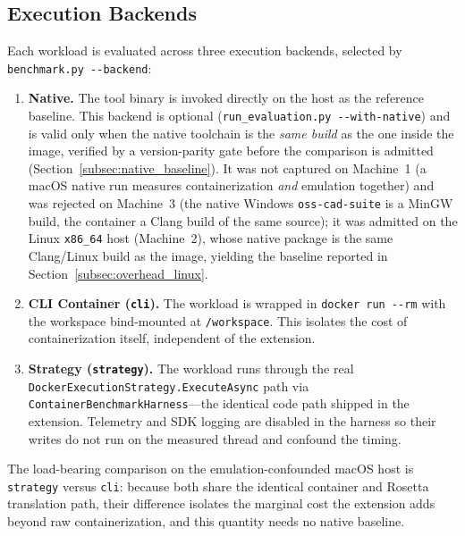 \subsection{Execution Backends}
Each workload is evaluated across three execution backends, selected by \texttt{benchmark.py -{}-backend}:
\begin{enumerate}
    \item \textbf{Native.} The tool binary is invoked directly on the host as the reference baseline. This backend is optional (\texttt{run\_evaluation.py -{}-with-native}) and is valid only when the native toolchain is the \emph{same build} as the one inside the image, verified by a version-parity gate before the comparison is admitted (Section~\ref{subsec:native_baseline}). It was not captured on Machine~1 (a macOS native run measures containerization \emph{and} emulation together) and was rejected on Machine~3 (the native Windows \texttt{oss-cad-suite} is a MinGW build, the container a Clang build of the same source); it was admitted on the Linux \texttt{x86\_64} host (Machine~2), whose native package is the same Clang/Linux build as the image, yielding the baseline reported in Section~\ref{subsec:overhead_linux}.
    \item \textbf{CLI Container (\texttt{cli}).} The workload is wrapped in \texttt{docker run -{}-rm} with the workspace bind-mounted at \texttt{/workspace}. This isolates the cost of containerization itself, independent of the extension.
    \item \textbf{Strategy (\texttt{strategy}).} The workload runs through the real \texttt{DockerExecutionStrategy}\-\texttt{.ExecuteAsync} path via \texttt{ContainerBenchmarkHarness}---the identical code path shipped in the extension. Telemetry and SDK logging are disabled in the harness so their writes do not run on the measured thread and confound the timing.
\end{enumerate}
The load-bearing comparison on the emulation-confounded macOS host is \texttt{strategy} versus \texttt{cli}: because both share the identical container and Rosetta translation path, their difference isolates the marginal cost the extension adds beyond raw containerization, and this quantity needs no native baseline.

